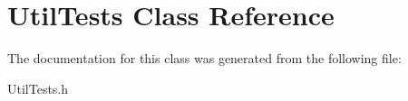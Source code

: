 \hypertarget{interface_util_tests}{
\section{\-Util\-Tests \-Class \-Reference}
\label{interface_util_tests}
}


\-The documentation for this class was generated from the following file\-:\begin{DoxyCompactItemize}
\item 
\-Util\-Tests.\-h\end{DoxyCompactItemize}
